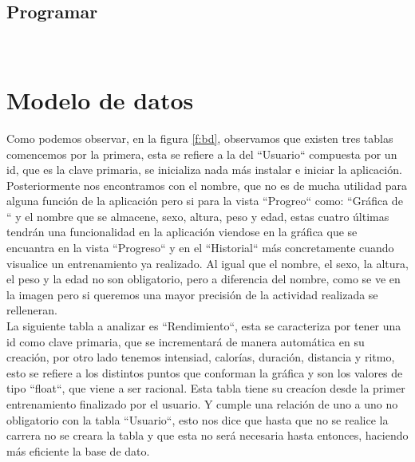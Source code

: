 \documentclass[a4paper, 11pt]{article}
\begin{document}
\begin{itemize}
       \subsection{Programar}\\

\section{Modelo de datos}

    Como podemos observar, en la figura \ref{f:bd}, observamos que existen tres tablas
    comencemos por la primera, esta se refiere a la del ``Usuario`` compuesta por un id, que
    es la clave primaria, se inicializa nada más instalar e iniciar la aplicación. Posteriormente
    nos encontramos con el nombre, que no es de mucha utilidad para alguna función de la aplicación
    pero si para la vista ``Progreo`` como: ``Gráfica de `` y el nombre que se almacene, sexo,
    altura, peso y edad, estas cuatro últimas tendrán una funcionalidad en la aplicación viendose
    en la gráfica que se encuantra en la vista ``Progreso`` y en el ``Historial`` más concretamente
    cuando visualice un entrenamiento ya realizado. Al igual que el nombre, el sexo, la altura, el
    peso y la edad no son obligatorio, pero a diferencia del nombre, como se ve en la imagen pero
    si queremos una mayor precisión de la actividad realizada se relleneran.\\

    La siguiente tabla a analizar es ``Rendimiento``, esta se caracteriza por tener una id como
    clave primaria, que se incrementará de manera automática en su creación, por otro lado tenemos
    intensiad, calorías, duración, distancia y ritmo, esto se refiere a los distintos puntos que
    conforman la gráfica y son los valores de tipo ``float``, que viene a ser racional. Esta tabla
    tiene su creacíon desde la primer entrenamiento finalizado por el usuario. Y cumple una relación
    de uno a uno no obligatorio con la tabla ``Usuario``, esto nos dice que hasta que no se realice
    la carrera no se creara la tabla y que esta no será necesaria hasta entonces, haciendo más eficiente
    la base de dato.\\


\end{itemize}
\end{document}
